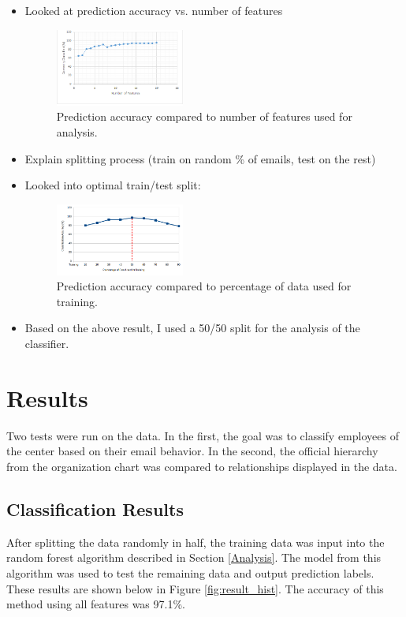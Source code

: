 \documentclass{article}
\begin{document}
\begin{itemize}
\item Looked at prediction accuracy vs. number of features

\begin{figure}[H]
    \centering
        \includegraphics[width=0.4\textwidth]{FeatureAnalysis}
        \caption{Prediction accuracy compared to number of features used for analysis.}
        \label{fig:feat_analysis}
\end{figure}



\item Explain splitting process (train on random \% of emails, test on the rest)
\item Looked into optimal train/test split:

\begin{figure}[H]
    \centering
        \includegraphics[width=0.4\textwidth]{SplitAnalysisWithLine}
        \caption{Prediction accuracy compared to percentage of data used for training.}
        \label{fig:split_analysis}
\end{figure}

\item Based on the above result, I used a 50/50 split for the analysis of the classifier.

\end{itemize}

\section{Results} \label{Results}
Two tests were run on the data.  In the first, the goal was to classify employees of the center based on their email behavior.  In the second, the official hierarchy from the organization chart was compared to relationships displayed in the data.

\subsection{Classification Results}
After splitting the data randomly in half, the training data was input into the random forest algorithm described in Section \ref{Analysis}.  The model from this algorithm was used to test the remaining data and output prediction labels.  These results are shown below in Figure \ref{fig:result_hist}.  The accuracy of this method using all features was 97.1\%.
\end{document}
